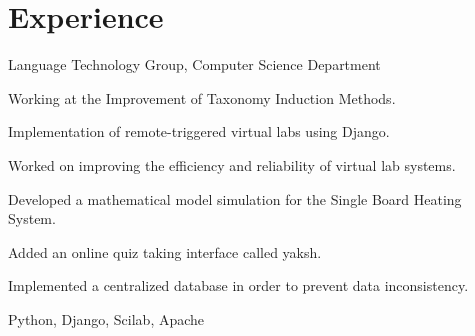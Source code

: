 
\section{Experience}

\vspace{\topsep} %
\begin{tightemize}
\item Language Technology Group, Computer Science Department
\item Working at the Improvement of Taxonomy Induction Methods.
\end{tightemize}
\sectionsep

\begin{tightemize}
\item Implementation of remote-triggered virtual labs using Django.
\item Worked on improving the efficiency and reliability of virtual lab systems.
\item Developed a mathematical model simulation for the Single Board Heating System.
\item Added an online quiz taking interface called yaksh.
\item Implemented a centralized database in order to prevent data inconsistency.
\item {} Python, Django, Scilab, Apache
\end{tightemize}
\sectionsep